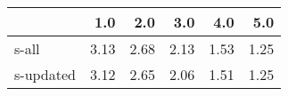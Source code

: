 \begin{tabular}{lrrrrr}
\toprule
{} &  1.0 &  2.0 &  3.0 &  4.0 &  5.0 \\
\midrule
s-all     & 3.13 & 2.68 & 2.13 & 1.53 & 1.25 \\
s-updated & 3.12 & 2.65 & 2.06 & 1.51 & 1.25 \\
\bottomrule
\end{tabular}
